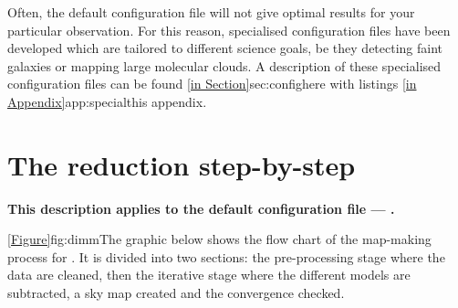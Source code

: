 \documentclass[11pt,oneside,chapters]{starlink}
\begin{document}
Often, the default configuration file will not give optimal results
for your particular observation. For this reason, specialised
configuration files have been developed which are tailored to
different science goals, be they detecting faint galaxies or mapping
large molecular clouds. A
description of these specialised configuration files can be found
\cref{in Section}{sec:config}{here} with listings
\cref{in Appendix}{app:special}{this appendix}.


\section{The reduction step-by-step}

\textbf{This description applies to the default configuration file ---
.}

\cref{Figure}{fig:dimm}{The graphic
below} shows the flow chart of the map-making process
for . It is divided into two sections: the
pre-processing stage where the data are cleaned, then the iterative
stage where the different models are subtracted, a sky map created
and the convergence checked.
\end{document}
